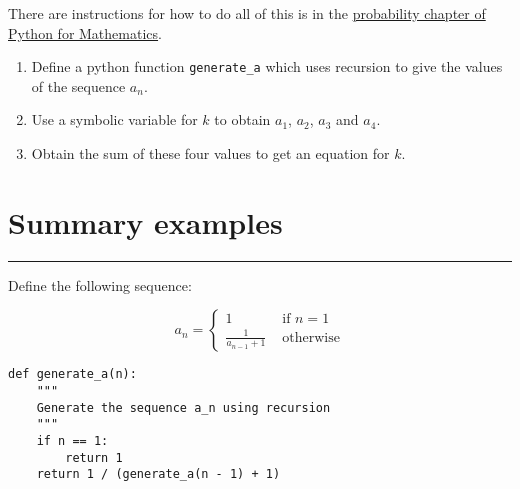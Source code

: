 \documentclass{article}
\begin{document}
There are instructions for how to do all of this is in the
\href{https://vknight.org/pfm/tools-for-mathematics/07-sequences/how/main.html}{probability chapter of Python for Mathematics}.


\begin{enumerate}
    \item Define a python function \texttt{generate_a} which uses
        recursion to give the values of the sequence \(a_n\).
    \item Use a symbolic variable for \(k\) to obtain $a_1$, $a_2$, $a_3$ and
        $a_4$.
    \item Obtain the sum of these four values to get an equation for \(k\).
\end{enumerate}

\section{Summary examples}
\hrule

    Define the following sequence:

    \[
        a_n = \begin{cases}
                1 & \text{ if }n=1\\
                \frac{1}{a_{n - 1} + 1}&\text{ otherwise}
              \end{cases}
    \]

        \begin{verbatim}
def generate_a(n):
    """
    Generate the sequence a_n using recursion
    """
    if n == 1:
        return 1
    return 1 / (generate_a(n - 1) + 1)
    \end{verbatim}
\end{document}
